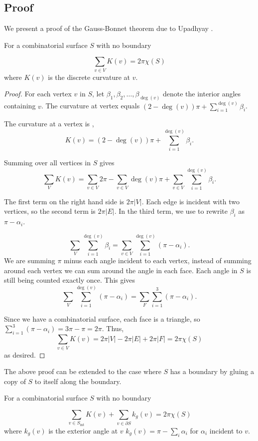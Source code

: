 \subsection{Proof}
\label{sec:proof}


We present a proof of the Gauss-Bonnet theorem due to Upadhyay \cite{upadhyay2015}.



\begin{theorem}\label{thm:g-b-discete-bdy}
For a combinatorial surface $S$ with no boundary

$$\sum_{v\in V} K(v)=2\pi \chi(S)$$
where $K(v)$ is the discrete curvature at $v$.
\end{theorem}

\begin{proof}

For each vertex $v$ in $S$,
let $\beta_1,\beta_2,\ldots,\beta_{\deg{(v)}}$ denote the interior angles
containing $v$.
The curvature at vertex equals $(2-\deg{(v)})\pi +\sum_{i=1}^{\deg{(v)}} \beta_i$.

The curvature at a vertex is ,
 $$K(v)=(2-\deg{(v)})\pi +\sum_{i=1}^{\deg{(v)}} \beta_i.$$

Summing over all vertices in $S$ gives
$$\sum_{V} K(v)=\sum_{v\in V}2\pi - \sum_{v\in V}\deg{(v)}\pi+\sum_{v\in V}\sum_{i=1}^{\deg{(v)}} \beta_i.$$

The first term on the right hand side is $2\pi |V|$. Each edge is incident with two vertices, so the second term is $2\pi |E|$. 
In the third term, we use  to rewrite $\beta_i$ as $\pi-\alpha_i$.

$$ \sum_{V}\sum_{i=1}^{\deg{(v)}} \beta_i= \sum_{v\in V}\sum_{i=1}^{\deg{(v)}} (\pi-\alpha_i).$$
We are summing $\pi$ minus each angle incident to each vertex, 
instead of summing around each vertex we can sum around the angle in each face.
Each angle in $S$ is still being counted exactly once. This gives
$$\sum_{V}\sum_{i=1}^{\deg{(v)}} (\pi-\alpha_i)=\sum_F\sum_{i=1}^3(\pi-\alpha_i).$$

Since we have a combinatorial surface, each face is a triangle,
so $\sum_{i=1}^3(\pi-\alpha_i)=3\pi-\pi=2\pi.$
Thus, $$\sum_{v\in V} K(v)=2\pi |V|-2\pi |E|+2\pi |F|=2\pi \chi(S)$$ as desired.
\end{proof}

The above proof can be extended to the case where $S$ has a boundary
by gluing a copy of $S$ to itself along the boundary.

\begin{theorem}\label{thm:g-b-discete}
For a combinatorial surface $S$ with no boundary

$$\sum_{v\in S_{\text{int}}} K(v)+\sum_{v\in\partial S}k_g(v)=2\pi \chi(S)$$
where $k_g(v)$ is the exterior angle at $v$ 
$k_g(v)=\pi-\sum_i\alpha_i$ for $\alpha_i$ incident to $v$.
\end{theorem}

